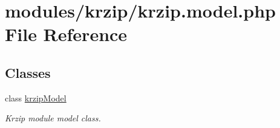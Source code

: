 \hypertarget{krzip_8model_8php}{\section{modules/krzip/krzip.model.\-php File Reference}
\label{krzip_8model_8php}
}
\subsection*{Classes}
\begin{DoxyCompactItemize}
\item 
class \hyperlink{classkrzipModel}{krzip\-Model}
\begin{DoxyCompactList}\small\item\em Krzip module model class. \end{DoxyCompactList}\end{DoxyCompactItemize}
